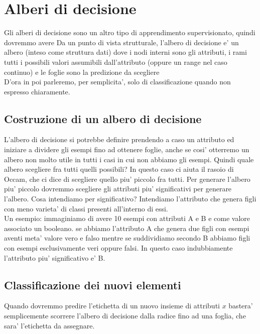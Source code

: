 \section*{Alberi di decisione}
Gli alberi di decisione sono un altro tipo di apprendimento supervisionato, quindi dovremmo avere 
Da un punto di vista strutturale, l'albero di decisione e' un albero (inteso come struttura dati) dove i nodi interni sono gli attributi, i rami tutti i possibili valori assumibili dall'attributo (oppure un range nel caso continuo) e le foglie sono la predizione da scegliere\\D'ora in poi parleremo, per semplicita', solo di classificazione quando non espresso chiaramente.
\subsection*{Costruzione di un albero di decisione}
L'albero di decisione si potrebbe definire prendendo a caso un attributo ed iniziare a dividere gli esempi fino ad ottenere foglie, anche se cosi' otterremo un albero  non molto utile in tutti i casi in cui non abbiamo gli esempi. Quindi quale albero scegliere fra tutti quelli possibili? In questo caso ci aiuta il rasoio di Occam, che ci dice di scegliere quello piu' piccolo fra tutti. Per generare l'albero piu' piccolo dovremmo scegliere gli attributi piu' significativi per generare l'albero. Cosa intendiamo per significativo? Intendiamo l'attributo che genera figli con meno varieta' di classi presenti all'interno di essi.\\ Un esempio: immaginiamo di avere 10 esempi con attributi A e B e come valore associato un booleano. se abbiamo l'attributo A che genera due figli con esempi aventi meta' valore vero e falso mentre se suddividiamo secondo B abbiamo figli con esempi esclusivamente veri oppure falsi. In questo caso indubbiamente l'attributo piu' significativo e' B.
\subsection*{Classificazione dei nuovi elementi}
Quando dovremmo predire l'etichetta di un nuovo insieme di attributi $x$ bastera' semplicemente scorrere l'albero di decisione dalla radice fino ad una foglia, che sara' l'etichetta da assegnare.
